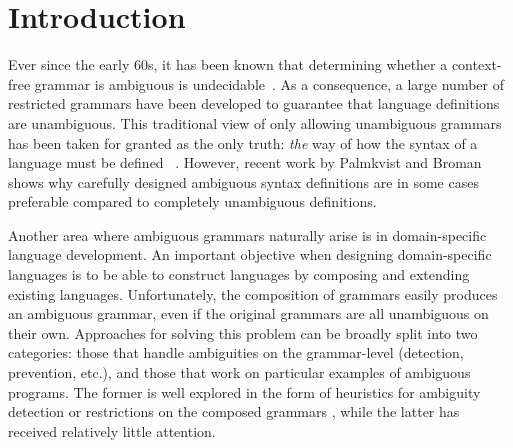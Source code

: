\documentclass[runningheads]{llncs}
\begin{document}
\section{Introduction}

Ever since the early 60s, it has been known that determining whether a context-free
grammar is ambiguous is undecidable~\cite{cantorAmbiguityProblemBackus1962}. As a consequence,
a large number of restricted grammars have been developed to guarantee
that language definitions are unambiguous. This traditional view of
only allowing unambiguous grammars has been taken for granted as the
only truth: \emph{the} way of how the syntax of a language must be
defined ~\cite{sudkampLanguagesMachinesIntroduction1997,ahoCompilersPrinciplesTechniques2006,webberModernProgrammingLanguages2003,cooperEngineeringCompiler2011,ginsburgAmbiguityContextFree1966}.
%
However, recent work by
Palmkvist and Broman~\cite{palmkvistCreatingDomainSpecificLanguages2019} shows why
carefully designed ambiguous syntax definitions are in some cases
preferable compared to completely unambiguous
definitions.



Another area where ambiguous grammars naturally arise is
in domain-specific language development.  An important
objective when designing domain-specific languages is to be able to construct
languages by composing and extending existing
languages.
Unfortunately, the composition of
%
grammars easily produces
an ambiguous grammar, even if the original grammars are all
unambiguous on their own. Approaches for solving this problem can be broadly split
into two categories: those that handle ambiguities on the
grammar-level (detection, prevention, etc.), and those that work on
particular examples of ambiguous programs. The former is well explored
in the form of heuristics for ambiguity detection
\cite{bastenAmbiguityDetectionProgramming2011,axelssonAnalyzingContextFreeGrammars2008,brabrandAnalyzingAmbiguityContextFree2007}
or restrictions on the composed grammars
\cite{kaminskiModularWellDefinednessAnalysis2013}, while the
latter has received relatively little attention.
\end{document}
